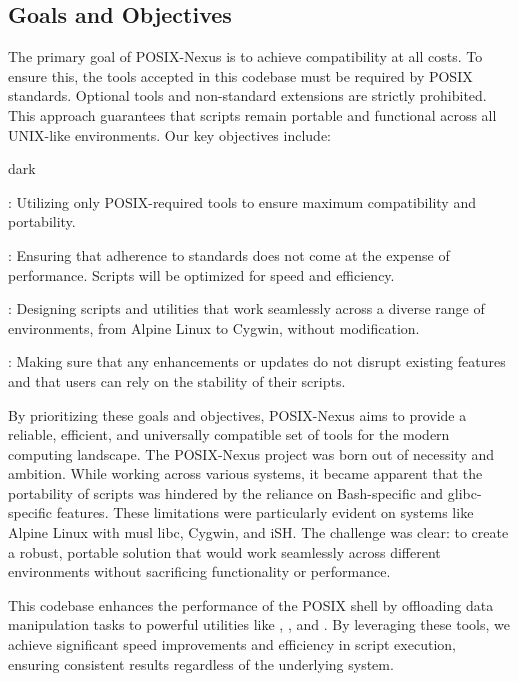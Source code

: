 \subsection{Goals and Objectives}
\label{sec:introduction:sub:goal}
The primary goal of POSIX-Nexus is to achieve compatibility at all costs.
To ensure this, the tools accepted in this codebase must be required by POSIX standards.
Optional tools and non-standard extensions are strictly prohibited.
This approach guarantees that scripts remain portable and functional across all UNIX-like environments.
Our key objectives include:
\bigskip
\begin{baseBoxOne}{}{dark}
    \begin{posnexItemize}
        \item[\sA] : Utilizing only POSIX-required tools to ensure maximum compatibility and portability. 
        \item[\sA] : Ensuring that adherence to standards does not come at the expense of performance. Scripts will be optimized for speed and efficiency. 
        \item[\sA] : Designing scripts and utilities that work seamlessly across a diverse range of environments, from Alpine Linux to Cygwin, without modification. 
        \item[\sA] : Making sure that any enhancements or updates do not disrupt existing features and that users can rely on the stability of their scripts. 
    \end{posnexItemize}
\end{baseBoxOne}
\bigskip
By prioritizing these goals and objectives, POSIX-Nexus aims to provide a reliable, efficient, and universally compatible set of tools for the modern computing landscape.
The POSIX-Nexus project was born out of necessity and ambition.
While working across various systems, it became apparent that the portability of scripts was hindered by the reliance on Bash-specific and glibc-specific features.
These limitations were particularly evident on systems like Alpine Linux with musl libc, Cygwin, and iSH.
The challenge was clear: to create a robust, portable solution that would work seamlessly across different environments without sacrificing functionality or performance.

This codebase enhances the performance of the POSIX shell by offloading data manipulation tasks to powerful utilities like , , and .
By leveraging these tools, we achieve significant speed improvements and efficiency in script execution, ensuring consistent results regardless of the underlying system.

